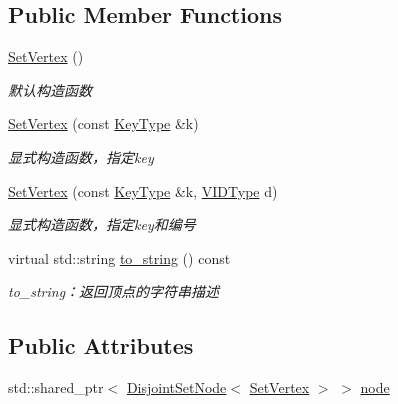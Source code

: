 \subsection*{Public Member Functions}
\begin{DoxyCompactItemize}
\item 
\hyperlink{struct_introduction_to_algorithm_1_1_graph_algorithm_1_1_set_vertex_a7a0dde758217623dbfb55598f677a4d7}{Set\+Vertex} ()
\begin{DoxyCompactList}\small\item\em 默认构造函数 \end{DoxyCompactList}\item 
\hyperlink{struct_introduction_to_algorithm_1_1_graph_algorithm_1_1_set_vertex_ae06d5b123f6a035074d270e1424ad7ec}{Set\+Vertex} (const \hyperlink{struct_introduction_to_algorithm_1_1_graph_algorithm_1_1_set_vertex_a0cfdcd9af991198be63495f7fb60965d}{Key\+Type} \&k)
\begin{DoxyCompactList}\small\item\em 显式构造函数，指定{\ttfamily key} \end{DoxyCompactList}\item 
\hyperlink{struct_introduction_to_algorithm_1_1_graph_algorithm_1_1_set_vertex_a86fd87e5d48a1b1f94ba643bd05bcc1f}{Set\+Vertex} (const \hyperlink{struct_introduction_to_algorithm_1_1_graph_algorithm_1_1_set_vertex_a0cfdcd9af991198be63495f7fb60965d}{Key\+Type} \&k, \hyperlink{struct_introduction_to_algorithm_1_1_graph_algorithm_1_1_set_vertex_ae69791a589d95b0f4f378e08b75b041c}{V\+I\+D\+Type} d)
\begin{DoxyCompactList}\small\item\em 显式构造函数，指定{\ttfamily key}和编号 \end{DoxyCompactList}\item 
virtual std\+::string \hyperlink{struct_introduction_to_algorithm_1_1_graph_algorithm_1_1_set_vertex_adb2f006ec656e2ca7c125191c601e307}{to\+\_\+string} () const 
\begin{DoxyCompactList}\small\item\em to\+\_\+string：返回顶点的字符串描述 \end{DoxyCompactList}\end{DoxyCompactItemize}
\subsection*{Public Attributes}
\begin{DoxyCompactItemize}
\item 
std\+::shared\+\_\+ptr$<$ \hyperlink{struct_introduction_to_algorithm_1_1_set_algorithm_1_1_disjoint_set_node}{Disjoint\+Set\+Node}$<$ \hyperlink{struct_introduction_to_algorithm_1_1_graph_algorithm_1_1_set_vertex}{Set\+Vertex} $>$ $>$ \hyperlink{struct_introduction_to_algorithm_1_1_graph_algorithm_1_1_set_vertex_aa01ac00440b97a31134559be597fe772}{node}
\end{DoxyCompactItemize}



